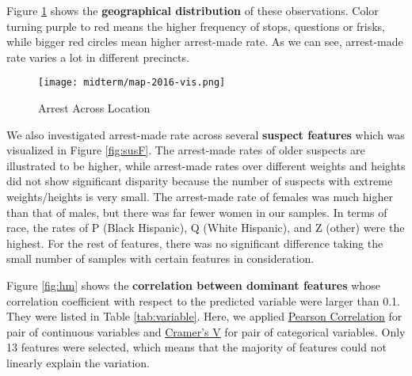
Figure \ref{fig:location} shows the \textbf{geographical distribution} of these observations. Color turning purple to red means the higher frequency of stops, questions or frisks, while bigger red circles mean higher arrest-made rate. As we can see, arrest-made rate varies a lot in different precincts.

\begin{figure}[htbp]
    \centering
    \texttt{[image: midterm/map-2016-vis.png]}
    \caption{Arrest Across Location}
    \label{fig:location}
\end{figure}



We also investigated arrest-made rate across several \textbf{suspect features} which was visualized in Figure \ref{fig:susF}. The arrest-made rates of older suspects are illustrated to be higher, while arrest-made rates over different weights and heights did not show significant disparity because the number of suspects with extreme weights/heights is very small. The arrest-made rate of females was much higher than that of males, but there was far fewer women in our samples. In terms of race, the rates of P (Black Hispanic), Q (White Hispanic), and Z (other) were the highest. For the rest of features, there was no significant difference taking the small number of samples with certain features in consideration.
%

Figure \ref{fig:hm} shows the \textbf{correlation between dominant features} whose correlation coefficient with respect to the predicted variable were larger than 0.1. They were listed in Table \ref{tab:variable}. Here, we applied \href{https://en.wikipedia.org/wiki/Pearson_correlation_coefficient}{Pearson Correlation} for pair of continuous variables and \href{https://en.wikipedia.org/wiki/Cram\%C3\%A9r\%27s_V}{Cramer's V} for pair of categorical variables. Only 13 features were selected, which means that the majority of features could not linearly explain the variation. 

